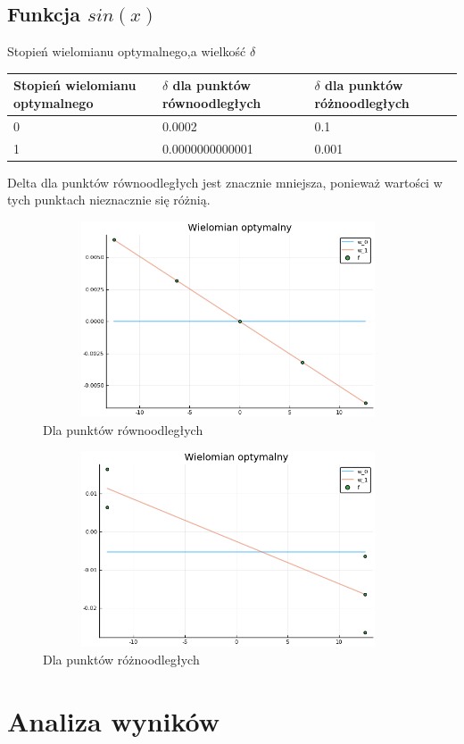 \documentclass{article}
\begin{document}
\subsection{Funkcja $sin(x)$}
Stopień wielomianu optymalnego,a wielkość $\delta$
\begin{center}
    \begin{tabular}{ |p{3cm}|p{4.6cm}|p{4.6cm}|}
     \hline
     Stopień wielomianu optymalnego & $\delta$ dla punktów równoodległych & $\delta$ dla punktów różnoodległych\\
     \hline
     0 & 0.0002 & 0.1\\
     \hline
     1 & 0.0000000000001 & 0.001\\
     \hline
    \end{tabular}
\end{center}
Delta dla punktów równoodległych jest znacznie mniejsza, ponieważ wartości w tych punktach nieznacznie się różnią. 
\begin{figure}[h]
\center
\includegraphics[width=11cm,height=5.8cm]{sin.png}
\caption{Dla punktów równoodległych}
\end{figure}

\begin{figure}[h]
\centering
\includegraphics[width=11cm,height=5.8cm]{sin2.png}
\caption{Dla punktów różnoodległych}
\end{figure}
\section{Analiza wyników}
\end{document}
